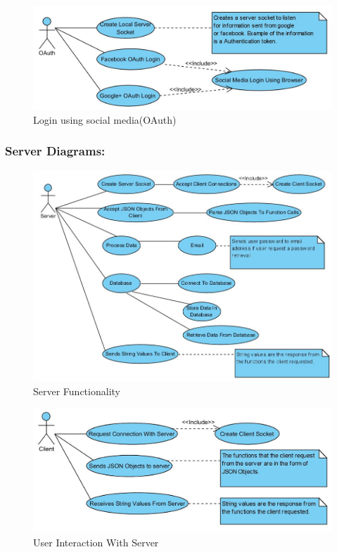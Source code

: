 \documentclass[letterpaper]{article}
\begin{document}
				\begin{figure}[H]
					\centering
					\includegraphics[width=140mm]{UML_Diagram/Use_Case/OAuth.jpg}
					\caption{Login using social media(OAuth)}
					\end{figure}
				
				\vspace{0.2in}
				\subsubsection*{Server Diagrams:}
				\vspace{0.2in}
				
					\begin{figure}[H]
					\centering
					\includegraphics[width=140mm]{UML_Diagram/Use_Case/Server.jpg}
					\caption{Server Functionality}
					\end{figure}
					
					\begin{figure}[H]
					\centering
					\includegraphics[width=140mm]{UML_Diagram/Use_Case/Client.jpg}
					\caption{User Interaction With Server}
					\end{figure}
				
\end{document}

